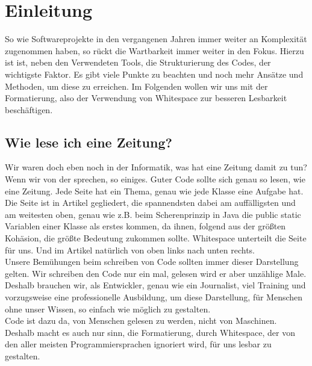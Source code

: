 \section{Einleitung}
	So wie Softwareprojekte in den vergangenen Jahren immer weiter an Komplexität zugenommen haben, so rückt die Wartbarkeit immer weiter in den Fokus.
	Hierzu ist ist, neben den Verwendeten Tools, die  Strukturierung des Codes, der wichtigste Faktor.
	Es gibt viele Punkte zu beachten und noch mehr Ansätze und Methoden, um diese zu erreichen.
	Im Folgenden wollen wir uns mit der Formatierung, also der Verwendung von Whitespace zur besseren Lesbarkeit beschäftigen.
	\subsection{Wie lese ich eine Zeitung?}
		Wir waren doch eben noch in der Informatik, was hat eine Zeitung damit zu tun?\\
		Wenn wir von der  sprechen, so einiges.
		Guter Code sollte sich genau so lesen, wie eine Zeitung.
		Jede Seite hat ein Thema, genau wie jede Klasse eine Aufgabe hat.
		Die Seite ist in Artikel gegliedert, die spannendsten dabei am auffälligsten und am weitesten oben, genau wie z.B. beim Scherenprinzip in Java die public static Variablen einer Klasse als erstes kommen, da ihnen, folgend aus der größten Kohäsion, die größte Bedeutung zukommen sollte.
		Whitespace unterteilt die Seite für uns.
		Und im Artikel natürlich von oben links nach unten rechts.\\
		Unsere Bemühungen beim schreiben von Code sollten immer dieser Darstellung gelten.
		Wir schreiben den Code nur ein mal, gelesen wird er aber unzählige Male.\\
		Deshalb brauchen wir, als Entwickler, genau wie ein Journalist, viel Training und vorzugsweise eine professionelle Ausbildung, um diese Darstellung, für Menschen ohne unser Wissen, so einfach wie möglich zu gestalten.\\
		Code ist dazu da, von Menschen gelesen zu werden, nicht von Maschinen.
		Deshalb macht es auch nur sinn, die Formatierung, durch Whitespace, der von den aller meisten Programmiersprachen ignoriert wird, für uns lesbar zu gestalten.

